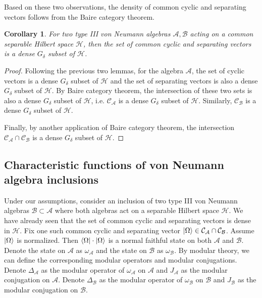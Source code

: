 \documentclass[a4paper,11pt]{article}
\newtheorem{corollary}[theorem]{Corollary}
\theoremstyle{definition}
\begin{document}
Based on these two observations, the density of common cyclic and separating vectors follows from the Baire category theorem. 
\begin{corollary}
    For two type III von Neumann algebras $\mathcal{A}, \mathcal{B}$ acting on a common separable Hilbert space $\mathcal{H}$, then the set of common cyclic and separating vectors is a dense $G_\delta$ subset of $\mathcal{H}$.
\end{corollary}
\begin{proof}
    Following the previous two lemmas, for the algebra $\mathcal{A}$, the set of cyclic vectors is a dense $G_\delta$ subset of $\mathcal{H}$ and the set of separating vectors is also a dense $G_\delta$ subset of $\mathcal{H}$. By Baire category theorem, the intersection of these two sets is also a dense $G_\delta$ subset of $\mathcal{H}$, i.e. $\mathcal{C}_\mathcal{A}$ is a dense $G_\delta$ subset of $\mathcal{H}$. Similarly, $\mathcal{C}_\mathcal{B}$ is a dense $G_\delta$ subset of $\mathcal{H}$.

    Finally, by another application of Baire category theorem, the intersection $\mathcal{C}_\mathcal{A}\cap\mathcal{C}_\mathcal{B}$ is a dense $G_\delta$ subset of $\mathcal{H}$.
\end{proof}
\subsection{Characteristic functions of von Neumann algebra inclusions}\label{subsection:characteristicfunctions}
Under our assumptions, consider an inclusion of two type III von Neumann algebras $\mathcal{B}\subset \mathcal{A}$ where both algebras act on a separable Hilbert space $\mathcal{H}$. We have already seen that the set of common cyclic and separating vectors is dense in $\mathcal{H}$. Fix one such common cyclic and separating vector $\ket{\Omega}\in\mathcal{C}_\mathcal{A}\cap\mathcal{C}_\mathcal{B}$. Assume $\ket{\Omega}$ is normalized. Then $\bra{\Omega}\cdot\ket{\Omega}$ is a normal faithful state on both $\mathcal{A}$ and $\mathcal{B}$. Denote the state on $\mathcal{A}$ as $\omega_\mathcal{A}$ and the state on $\mathcal{B}$ as $\omega_\mathcal{B}$. By modular theory, we can define the corresponding modular operators and modular conjugations. Denote $\Delta_\mathcal{A}$ as the modular operator of $\omega_\mathcal{A}$ on $\mathcal{A}$ and $J_\mathcal{A}$ as the modular conjugation on $\mathcal{A}$. Denote $\Delta_\mathcal{B}$ as the modular operator of $\omega_\mathcal{B}$ on $\mathcal{B}$ and $J_\mathcal{B}$ as the modular conjugation on $\mathcal{B}$.
\end{document}
